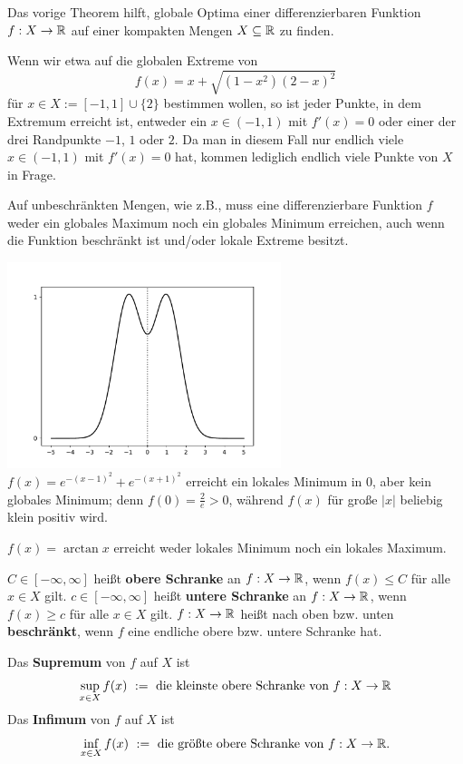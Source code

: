 \begin{bsp}
	Das vorige Theorem hilft, globale Optima einer differenzierbaren Funktion $ f: X \to \mathbb{R}$ auf einer kompakten Mengen $X \subseteq \mathbb{R}$ zu finden. 
	
	Wenn wir etwa auf die globalen Extreme von 
	\[
		f(x) = x +  \sqrt{(1-x^2) (2-x)^2 }  
	\]
	für $x \in X:= [-1,1] \cup \{2\}$ bestimmen wollen, so ist jeder Punkte, in dem Extremum erreicht ist, entweder ein $x \in (-1,1)$ mit $f'(x) = 0$ oder einer der drei Randpunkte $-1$, $1$ oder $2$. Da man in diesem Fall nur endlich viele $x \in (-1,1)$ mit $f'(x) = 0$ hat, kommen lediglich endlich viele Punkte von $X$ in Frage. 
\end{bsp} 

\begin{bsp} 
		Auf unbeschränkten Mengen, wie z.B., muss eine differenzierbare Funktion $f$  weder ein globales Maximum noch ein globales Minimum erreichen, auch wenn die Funktion beschränkt ist und/oder lokale Extreme besitzt. 
		\begin{center}
			\includegraphics[width=0.6\textwidth]{pics/camel.pdf}
			\\  $f(x) = e^{-(x-1)^2} + e^{-(x+1)^2}$ erreicht ein lokales Minimum in $0$, aber kein globales Minimum; denn $f(0) = \frac{2}{e} >0$, während $f(x)$ für große $|x|$ beliebig klein positiv wird. 
		\end{center}
	
\end{bsp} 

\begin{bsp} 
	$f(x) = \arctan x$ erreicht weder lokales Minimum noch ein lokales Maximum. 
\end{bsp} 

\begin{defn}
	$C \in [-\infty,\infty]$ heißt \textbf{obere Schranke} an $f : X \to \mathbb{R}$, wenn $f(x) \le C$ für alle $x \in X$ gilt. $c \in [-\infty,\infty]$ heißt \textbf{untere Schranke} an $f : X \to
 \mathbb{R}$, wenn $f(x) \ge c$ für alle $x \in X$ gilt.  $f : X \to \mathbb{R}$ heißt nach oben bzw. unten \textbf{beschränkt}, wenn $f$ eine endliche obere bzw. untere Schranke hat. 
 
	Das \textbf{Supremum} von $f$ auf $X$ ist 
	\[
		\sup_{x \in X} f(x) \ :=  \ \text{die kleinste obere Schranke von $f : X \to \mathbb{R}$}
	\]
	Das \textbf{Infimum} von $f$ auf $X$ ist 
	\[
		\inf_{x \in X} f(x)  \ :=  \ \text{die größte obere Schranke von $f : X \to \mathbb{R}$}.
	\]
\end{defn} 


